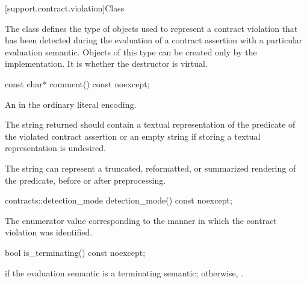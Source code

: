 [support.contract.violation]{Class }

\pnum
{}%
The class 
defines the type of objects used to represent
a contract violation that has been detected
during the evaluation of a contract assertion
with a particular evaluation semantic.
Objects of this type can
be created only by the implementation.
It is
whether the destructor is virtual.

\begin{itemdecl}
const char* comment() const noexcept;
\end{itemdecl}

\begin{itemdescr}
\pnum
\returns
An
\ntmbs{} in
the ordinary literal encoding.

\pnum
\recommended
The string returned
should contain a textual representation
of the predicate of the violated contract assertion
or an empty string if
storing a textual representation is undesired.
\begin{note}
The string can represent a
truncated, reformatted, or summarized rendering of the
predicate, before or after preprocessing.
\end{note}

\end{itemdescr}

\begin{itemdecl}
contracts::detection_mode detection_mode() const noexcept;
\end{itemdecl}

\begin{itemdescr}
\pnum
\returns
The enumerator value
corresponding to
the manner in which the contract violation was identified.

\end{itemdescr}

\begin{itemdecl}
bool is_terminating() const noexcept;
\end{itemdecl}

\begin{itemdescr}
%
\pnum
\returns
{} if the evaluation semantic is
a terminating semantic;
otherwise, .

\end{itemdescr}


